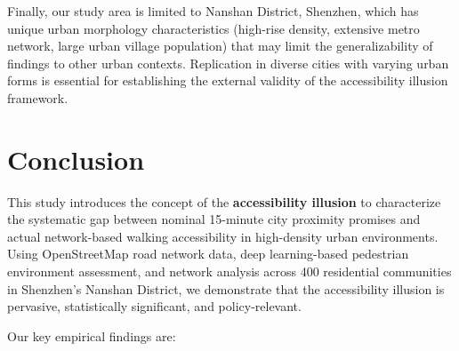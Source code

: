 \documentclass[10pt,conference,compsoc]{IEEEtran}
\begin{document}
\begin{table}[htbp]
\begin{center}
Finally, our study area is limited to Nanshan District, Shenzhen, which has unique urban morphology characteristics (high-rise density, extensive metro network, large urban village population) that may limit the generalizability of findings to other urban contexts. Replication in diverse cities with varying urban forms is essential for establishing the external validity of the accessibility illusion framework.

\section{Conclusion}
\label{sec:conclusion}

This study introduces the concept of the \textbf{accessibility illusion} to characterize the systematic gap between nominal 15-minute city proximity promises and actual network-based walking accessibility in high-density urban environments. Using OpenStreetMap road network data, deep learning-based pedestrian environment assessment, and network analysis across 400 residential communities in Shenzhen's Nanshan District, we demonstrate that the accessibility illusion is pervasive, statistically significant, and policy-relevant.

Our key empirical findings are:


\end{center}
\end{table}
\end{document}
